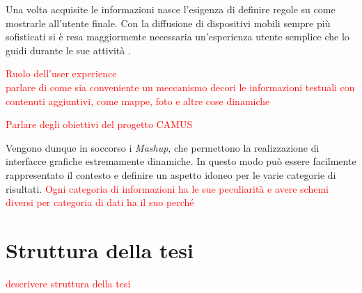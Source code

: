 
Una volta acquisite le informazioni nasce l'esigenza di definire regole su come mostrarle all'utente finale. Con la diffusione di dispositivi mobili sempre più sofisticati si è resa maggiormente necessaria un'esperienza utente semplice che lo guidi durante le sue attività .

\textcolor{red}{Ruolo dell'user experience\\
	parlare di come sia conveniente un meccanismo decori le informazioni testuali con contenuti aggiuntivi, come mappe, foto e altre cose dinamiche}

\textcolor{red}{Parlare degli obiettivi del progetto CAMUS}

Vengono dunque in soccorso i \emph{Mashup}, che permettono la realizzazione di interfacce grafiche estremamente dinamiche. In questo modo può essere facilmente rappresentato il contesto e definire un aspetto idoneo per le varie categorie di risultati. \textcolor{red}{Ogni categoria di informazioni ha le sue peculiarità e avere schemi diversi per categoria di dati ha il suo perché}

\section{Struttura della tesi\label{sec:struttura-tesi}}

\textcolor{red}{descrivere struttura della tesi}